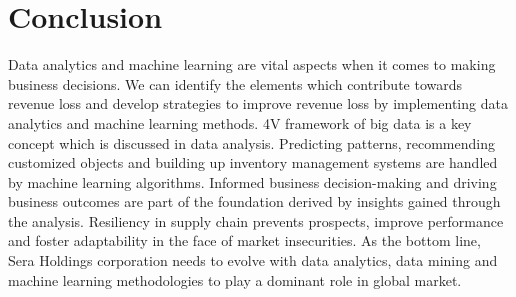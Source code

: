 \documentclass[12pt,a4Paper]{article}
\begin{document}
\section{Conclusion}
Data analytics and machine learning are vital aspects when it comes to making business decisions. We can identify the elements which contribute towards revenue loss and develop strategies to improve revenue loss by implementing data analytics and machine learning methods. 4V framework of big data is a key concept which is discussed in data analysis. Predicting patterns, recommending customized objects and building up inventory management systems are handled by machine learning algorithms. Informed business decision-making and driving business outcomes are part of the foundation derived by insights gained through the analysis. Resiliency in supply chain prevents prospects, improve performance and foster adaptability in the face of market insecurities. As the bottom line, Sera Holdings corporation needs to evolve with data analytics, data mining and machine learning methodologies to play a dominant role in global market.  

\end{document}
